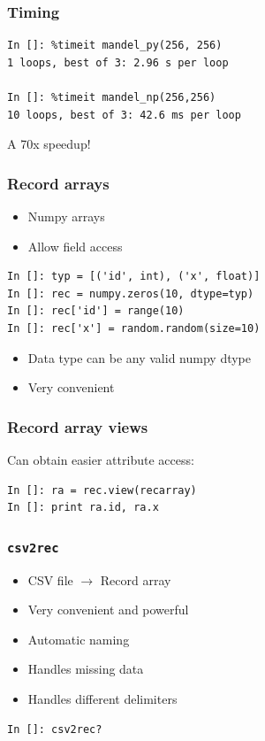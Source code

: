 \documentclass[14pt,compress]{beamer}
\newcounter{time}
\newcommand{\inctime}[1]{\addtocounter{time}{#1}{\tiny \thetime\ m}}
\newcommand{\typ}[1]{\lstinline{#1}}
\begin{document}
\begin{frame}[fragile]
    \frametitle{Timing}
    \begin{lstlisting}
In []: %timeit mandel_py(256, 256)
1 loops, best of 3: 2.96 s per loop

In []: %timeit mandel_np(256,256)
10 loops, best of 3: 42.6 ms per loop
    \end{lstlisting}
A 70x speedup!

\inctime{10}
\end{frame}


\begin{frame}[fragile]
    \frametitle{Record arrays}
    \begin{itemize}
        \item Numpy arrays
        \item Allow field access 
    \end{itemize}
    \begin{lstlisting}
In []: typ = [('id', int), ('x', float)]
In []: rec = numpy.zeros(10, dtype=typ)
In []: rec['id'] = range(10)
In []: rec['x'] = random.random(size=10)
    \end{lstlisting}
    \begin{itemize}
        \item Data type can be any valid numpy dtype
        \item Very convenient
    \end{itemize}
\end{frame}

\begin{frame}[fragile]
    \frametitle{Record array views}
Can obtain easier attribute access:

    \begin{lstlisting}
In []: ra = rec.view(recarray)
In []: print ra.id, ra.x
    \end{lstlisting}
\end{frame}

\begin{frame}[fragile]
    \frametitle{\typ{csv2rec}}
    \begin{itemize}
        \item CSV file $\rightarrow$ Record array
        \item Very convenient and powerful
        \item Automatic naming
        \item Handles missing data
        \item Handles different delimiters
    \end{itemize}
    \begin{lstlisting}
In []: csv2rec?
    \end{lstlisting}
\end{frame}
\end{document}
